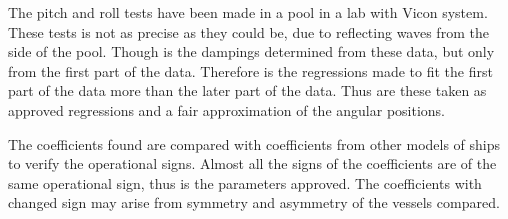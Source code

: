 The pitch and roll tests have been made in a pool in a lab with Vicon system. These tests is not as precise as they could be, due to reflecting waves from the side of the pool. Though is the dampings determined from these data, but only from the first part of the data. Therefore is the regressions made to fit the first part of the data more than the later part of the data. Thus are these taken as approved regressions and a fair approximation of the angular positions.

The coefficients found are compared with coefficients from other models of ships to verify the operational signs. Almost all the signs of the coefficients are of the same operational sign, thus is the parameters approved. The coefficients with changed sign may arise from symmetry and asymmetry of the vessels compared.